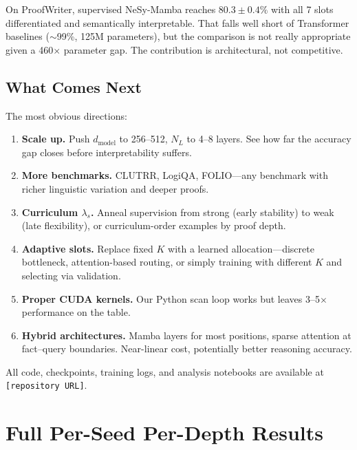 \documentclass[conference]{IEEEtran}
\DeclareRobustCommand{\model}{NeSy-Mamba}
\begin{document}
On ProofWriter, supervised \model{} reaches $80.3 \pm 0.4\%$
with all 7 slots differentiated and semantically interpretable.
That falls well short of Transformer baselines ($\sim$99\%,
125M parameters), but the comparison is not really appropriate
given a 460$\times$ parameter gap. The contribution is
architectural, not competitive.

\subsection{What Comes Next}

The most obvious directions:
\begin{enumerate}[nosep]
    \item \textbf{Scale up.}  Push $d_{\text{model}}$ to
          256--512, $N_L$ to 4--8 layers. See how far the
          accuracy gap closes before interpretability suffers.
    \item \textbf{More benchmarks.}  CLUTRR, LogiQA, FOLIO---any
          benchmark with richer linguistic variation and deeper
          proofs.
    \item \textbf{Curriculum $\lambda_s$.}  Anneal supervision
          from strong (early stability) to weak (late flexibility),
          or curriculum-order examples by proof depth.
    \item \textbf{Adaptive slots.}  Replace fixed $K$ with a
          learned allocation---discrete bottleneck, attention-based
          routing, or simply training with different $K$ and
          selecting via validation.
    \item \textbf{Proper CUDA kernels.}  Our Python scan loop
          works but leaves 3--5$\times$ performance on the table.
    \item \textbf{Hybrid architectures.}  Mamba layers for most
          positions, sparse attention at fact--query boundaries.
          Near-linear cost, potentially better reasoning accuracy.
\end{enumerate}

All code, checkpoints, training logs, and analysis notebooks are
available at \texttt{[repository URL]}.


\appendix

\section{Full Per-Seed Per-Depth Results}
\label{app:full_results}
\end{document}
